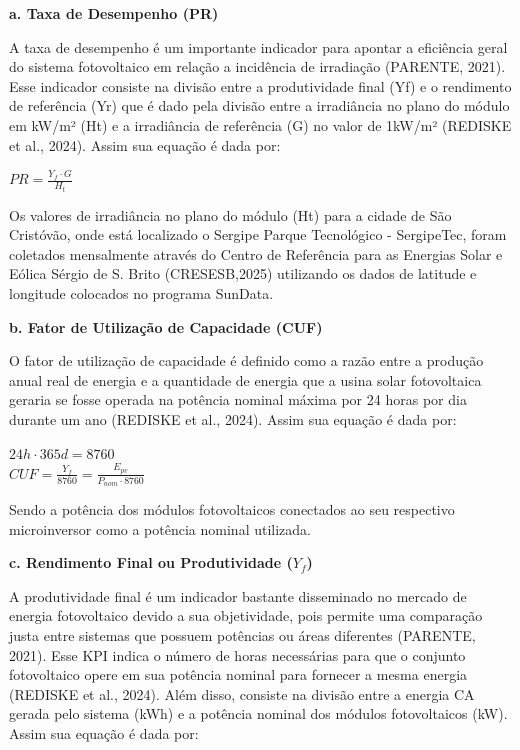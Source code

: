 \textbf{a. Taxa de  Desempenho (PR)}


A taxa de desempenho é um importante indicador para apontar a eficiência geral do sistema fotovoltaico em relação a incidência de irradiação (PARENTE, 2021). Esse indicador consiste na divisão entre a produtividade final (Yf) e o rendimento de referência (Yr) que é dado pela divisão entre a irradiância no plano do módulo em kW/m² (Ht) e a irradiância de referência (G) no valor de 1kW/m² (REDISKE et al., 2024). Assim sua equação é dada por:


\begin{center}
    $ PR = \frac{Y_f \cdot G}{H_t}$
\end{center}

Os valores de irradiância no plano do módulo (Ht) para a cidade de São Cristóvão, onde está localizado o Sergipe Parque Tecnológico - SergipeTec, foram coletados mensalmente através do Centro de Referência para as Energias Solar e Eólica Sérgio de S. Brito (CRESESB,2025) utilizando os dados de latitude e longitude colocados no programa SunData.

\textbf{b.	Fator de Utilização de Capacidade (CUF)}

O fator de utilização de capacidade é definido como a razão entre a produção anual real de energia e a quantidade de energia que a usina solar fotovoltaica geraria se fosse operada na potência nominal máxima por 24 horas por dia durante um ano (REDISKE et al., 2024). Assim sua equação é dada por:

\begin{center}
    $ 24h \cdot 365d = 8760$ \\
    $CUF = \frac{Y_f}{8760} = \frac{E_{pv}}{P_{nom} \cdot 8760}$
\end{center}

Sendo a potência dos módulos fotovoltaicos conectados ao seu respectivo microinversor como a potência nominal utilizada.

\textbf{c.	Rendimento Final ou Produtividade ($Y_f$)}

A produtividade final é um indicador bastante disseminado no mercado de energia fotovoltaico devido a sua objetividade, pois permite uma comparação justa entre sistemas que possuem potências ou áreas diferentes (PARENTE, 2021). Esse KPI indica o número de horas necessárias para que o conjunto fotovoltaico opere em sua potência nominal para fornecer a mesma energia (REDISKE et al., 2024). Além disso, consiste na divisão entre a energia CA gerada pelo sistema (kWh) e a potência nominal dos módulos fotovoltaicos (kW). Assim sua equação é dada por: 

